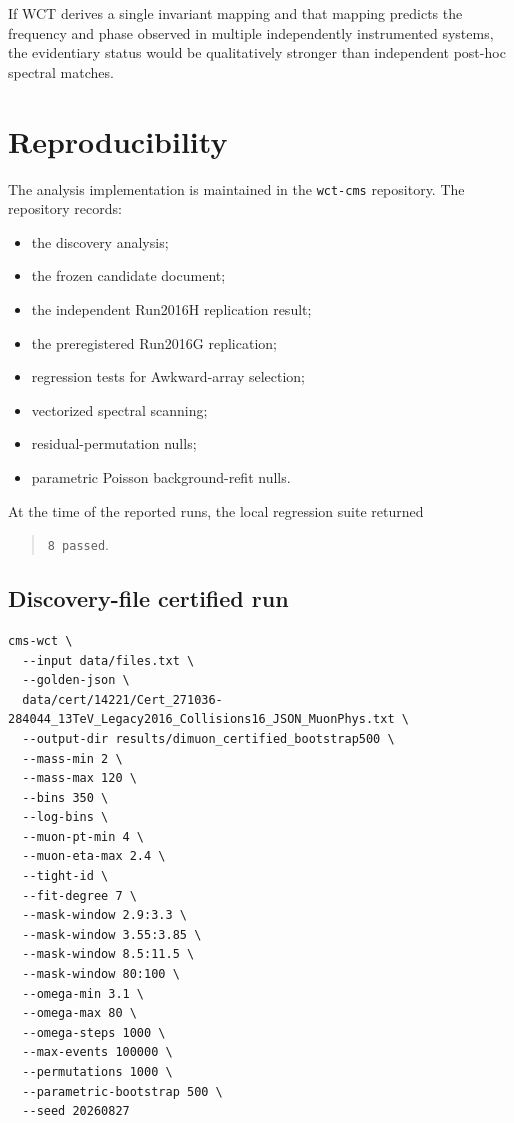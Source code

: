 \documentclass[11pt]{article}
\begin{document}
If WCT derives a single invariant mapping and that mapping predicts the
frequency and phase observed in multiple independently instrumented systems,
the evidentiary status would be qualitatively stronger than independent
post-hoc spectral matches.

\section{Reproducibility}

The analysis implementation is maintained in the
\texttt{wct-cms} repository.  The repository records:
\begin{itemize}
    \item the discovery analysis;
    \item the frozen candidate document;
    \item the independent Run2016H replication result;
    \item the preregistered Run2016G replication;
    \item regression tests for Awkward-array selection;
    \item vectorized spectral scanning;
    \item residual-permutation nulls;
    \item parametric Poisson background-refit nulls.
\end{itemize}

At the time of the reported runs, the local regression suite returned
\begin{quote}
\texttt{8 passed}.
\end{quote}

\subsection{Discovery-file certified run}

\begin{lstlisting}[basicstyle=\ttfamily\small,breaklines=true]
cms-wct \
  --input data/files.txt \
  --golden-json \
  data/cert/14221/Cert_271036-284044_13TeV_Legacy2016_Collisions16_JSON_MuonPhys.txt \
  --output-dir results/dimuon_certified_bootstrap500 \
  --mass-min 2 \
  --mass-max 120 \
  --bins 350 \
  --log-bins \
  --muon-pt-min 4 \
  --muon-eta-max 2.4 \
  --tight-id \
  --fit-degree 7 \
  --mask-window 2.9:3.3 \
  --mask-window 3.55:3.85 \
  --mask-window 8.5:11.5 \
  --mask-window 80:100 \
  --omega-min 3.1 \
  --omega-max 80 \
  --omega-steps 1000 \
  --max-events 100000 \
  --permutations 1000 \
  --parametric-bootstrap 500 \
  --seed 20260827
\end{lstlisting}
\end{document}

